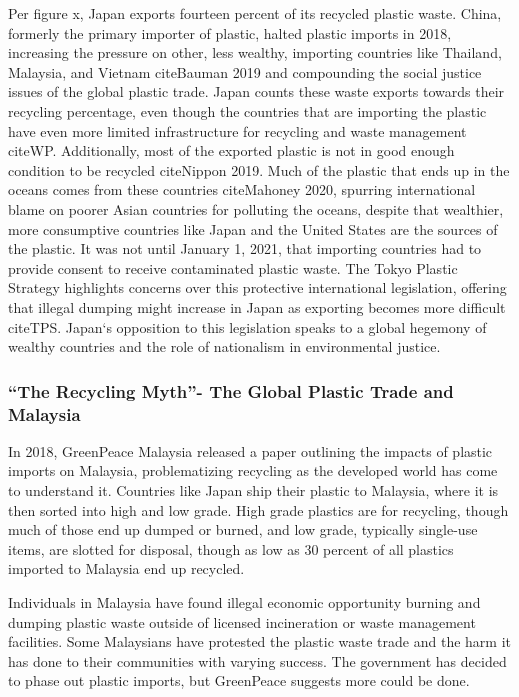 \documentclass{book}\usepackage{knitr}
\begin{document}
Per figure x, Japan exports fourteen percent of its recycled plastic waste. China, formerly the primary importer of plastic, halted plastic imports in 2018, increasing the pressure on other, less wealthy, importing countries like Thailand, Malaysia, and Vietnam citeBauman 2019 and compounding the social justice issues of the global plastic trade. Japan counts these waste exports towards their recycling percentage, even though the countries that are importing the plastic have even more limited infrastructure for recycling and waste management citeWP. Additionally, most of the exported plastic is not in good enough condition to be recycled citeNippon 2019. Much of the plastic that ends up in the oceans comes from these countries citeMahoney 2020, spurring international blame on poorer Asian countries for polluting the oceans, despite that wealthier, more consumptive countries like Japan and the United States are the sources of the plastic. It was not until January 1, 2021, that importing countries had to provide consent to receive contaminated plastic waste. The Tokyo Plastic Strategy highlights concerns over this protective international legislation, offering that illegal dumping might increase in Japan as exporting becomes more difficult citeTPS. Japan`s opposition to this legislation speaks to a global hegemony of wealthy countries and the role of nationalism in environmental justice. 

\subsubsection{``The Recycling Myth''- The Global Plastic Trade and Malaysia}

In 2018, GreenPeace Malaysia released a paper outlining the impacts of plastic imports on Malaysia, problematizing recycling as the developed world has come to understand it. Countries like Japan ship their plastic to Malaysia, where it is then sorted into high and low grade. High grade plastics are for recycling, though much of those end up dumped or burned, and low grade, typically single-use items, are slotted for disposal, though as low as 30 percent of all plastics imported to Malaysia end up recycled.

Individuals in Malaysia have found illegal economic opportunity burning and dumping plastic waste outside of licensed incineration or waste management facilities. Some Malaysians have protested the plastic waste trade and the harm it has done to their communities with varying success. The government has decided to phase out plastic imports, but GreenPeace suggests more could be done. 
\end{document}
